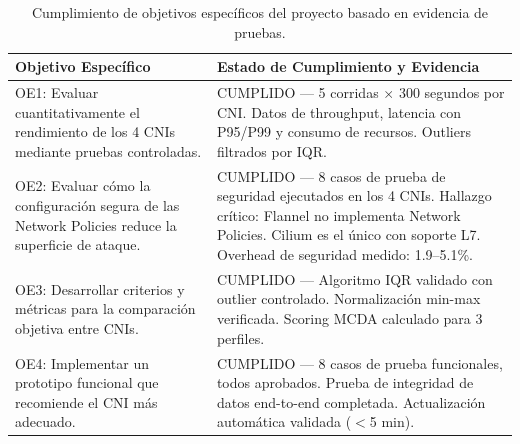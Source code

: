 \begin{table}[htbp]
\centering
\scriptsize
\begin{tabularx}{\textwidth}{|Y|Y|}
\hline
\textbf{Objetivo Específico} & \textbf{Estado de Cumplimiento y Evidencia} \\
\hline
OE1: Evaluar cuantitativamente el rendimiento de los 4 CNIs mediante pruebas controladas. & CUMPLIDO --- 5 corridas $\times$ 300 segundos por CNI. Datos de throughput, latencia con P95/P99 y consumo de recursos. Outliers filtrados por IQR. \\
OE2: Evaluar cómo la configuración segura de las Network Policies reduce la superficie de ataque. & CUMPLIDO --- 8 casos de prueba de seguridad ejecutados en los 4 CNIs. Hallazgo crítico: Flannel no implementa Network Policies. Cilium es el único con soporte L7. Overhead de seguridad medido: 1.9--5.1\%. \\
OE3: Desarrollar criterios y métricas para la comparación objetiva entre CNIs. & CUMPLIDO --- Algoritmo IQR validado con outlier controlado. Normalización min-max verificada. Scoring MCDA calculado para 3 perfiles. \\
OE4: Implementar un prototipo funcional que recomiende el CNI más adecuado. & CUMPLIDO --- 8 casos de prueba funcionales, todos aprobados. Prueba de integridad de datos end-to-end completada. Actualización automática validada ($<$5 min). \\
\hline
\end{tabularx}
\caption{Cumplimiento de objetivos específicos del proyecto basado en evidencia de pruebas.}
\end{table}
